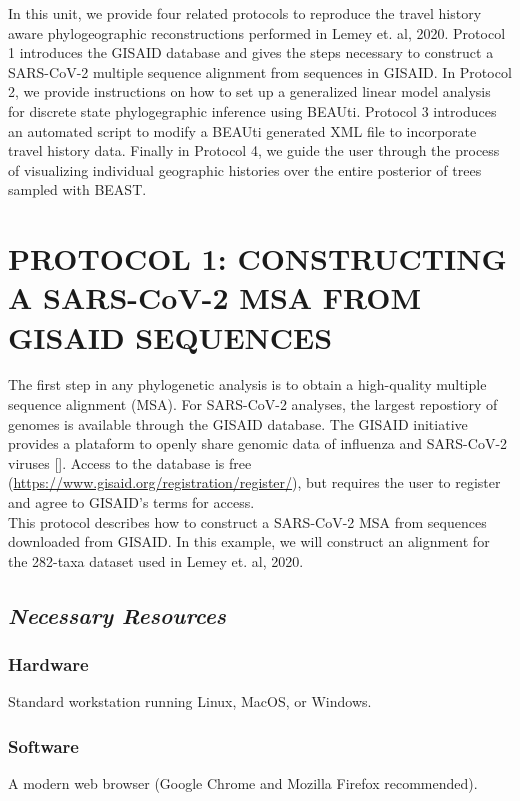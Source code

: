\documentclass{article}
\begin{document}
In this unit, we provide four related protocols to reproduce the travel history aware phylogeographic reconstructions performed in Lemey et. al, 2020. Protocol 1 introduces the GISAID database and gives the steps necessary to construct a SARS-CoV-2 multiple sequence alignment from sequences in GISAID. In Protocol 2, we provide instructions on how to set up a generalized linear model analysis for discrete state phylogegraphic inference using BEAUti. Protocol 3 introduces an automated script to modify a BEAUti generated XML file to incorporate travel history data. Finally in Protocol 4, we guide the user through the process of visualizing individual geographic histories over the entire posterior of trees sampled with BEAST.

\section*{PROTOCOL 1: CONSTRUCTING A SARS-CoV-2 MSA FROM GISAID SEQUENCES}

The first step in any phylogenetic analysis is to obtain a high-quality multiple sequence alignment (MSA). For SARS-CoV-2 analyses, the largest repostiory of genomes is available through the GISAID database. The GISAID initiative provides a plataform to openly share genomic data of influenza and SARS-CoV-2 viruses [\cite{gisaid}]. Access to the database is free (\url{https://www.gisaid.org/registration/register/}), but requires the user to register and agree to GISAID's terms for access.\\

This protocol describes how to construct a SARS-CoV-2 MSA from sequences downloaded from GISAID. In this example, we will construct an alignment for the 282-taxa dataset used in Lemey et. al, 2020.

\subsection*{\textbf{\textit{Necessary Resources}}}
\subsubsection*{Hardware}
\hspace{0.5cm}Standard workstation running Linux, MacOS, or Windows. 

\subsubsection*{Software}
\hspace{0.5cm}A modern web browser (Google Chrome and Mozilla Firefox recommended).
\end{document}
